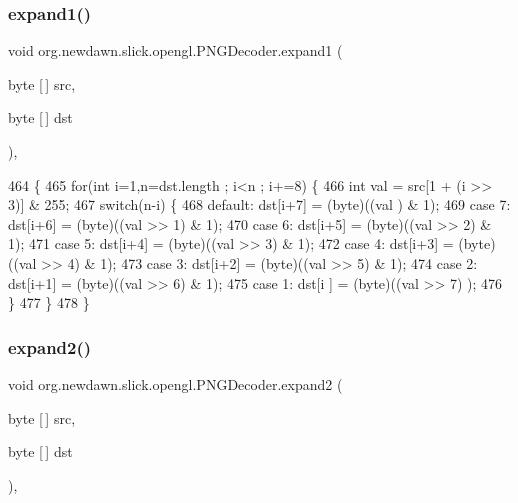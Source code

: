 \subsubsection{\texorpdfstring{expand1()}{expand1()}}
{\footnotesize\ttfamily void org.\+newdawn.\+slick.\+opengl.\+P\+N\+G\+Decoder.\+expand1 (\begin{DoxyParamCaption}\item[{byte \mbox{[}$\,$\mbox{]}}]{src,  }\item[{byte \mbox{[}$\,$\mbox{]}}]{dst }\end{DoxyParamCaption})\hspace{0.3cm}{\ttfamily [inline]}, {\ttfamily [private]}}


\begin{DoxyCode}
464                                                  \{
465         \textcolor{keywordflow}{for}(\textcolor{keywordtype}{int} i=1,n=dst.length ; i<n ; i+=8) \{
466             \textcolor{keywordtype}{int} val = src[1 + (i >> 3)] & 255;
467             \textcolor{keywordflow}{switch}(n-i) \{
468                 \textcolor{keywordflow}{default}: dst[i+7] = (byte)((val     ) & 1);
469                 \textcolor{keywordflow}{case} 7:  dst[i+6] = (byte)((val >> 1) & 1);
470                 \textcolor{keywordflow}{case} 6:  dst[i+5] = (byte)((val >> 2) & 1);
471                 \textcolor{keywordflow}{case} 5:  dst[i+4] = (byte)((val >> 3) & 1);
472                 \textcolor{keywordflow}{case} 4:  dst[i+3] = (byte)((val >> 4) & 1);
473                 \textcolor{keywordflow}{case} 3:  dst[i+2] = (byte)((val >> 5) & 1);
474                 \textcolor{keywordflow}{case} 2:  dst[i+1] = (byte)((val >> 6) & 1);
475                 \textcolor{keywordflow}{case} 1:  dst[i  ] = (byte)((val >> 7)    );
476             \}
477         \}
478     \}
\end{DoxyCode}
\mbox{\label{classorg_1_1newdawn_1_1slick_1_1opengl_1_1_p_n_g_decoder_aa9bfde671b761d559aaa785457ec5c94}} 
\subsubsection{\texorpdfstring{expand2()}{expand2()}}
{\footnotesize\ttfamily void org.\+newdawn.\+slick.\+opengl.\+P\+N\+G\+Decoder.\+expand2 (\begin{DoxyParamCaption}\item[{byte \mbox{[}$\,$\mbox{]}}]{src,  }\item[{byte \mbox{[}$\,$\mbox{]}}]{dst }\end{DoxyParamCaption})\hspace{0.3cm}{\ttfamily [inline]}, {\ttfamily [private]}}


